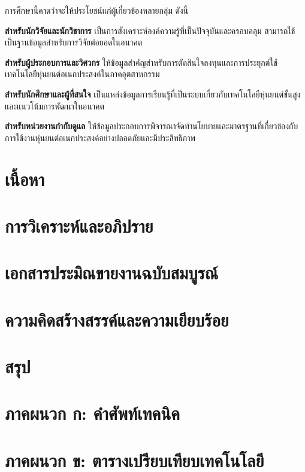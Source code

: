 \documentclass[a4paper]{article}
\begin{document}
การศึกษานี้คาดว่าจะให้ประโยชน์แก่ผู้เกี่ยวข้องหลายกลุ่ม ดังนี้

\textbf{สำหรับนักวิจัยและนักวิชาการ} เป็นการสังเคราะห์องค์ความรู้ที่เป็นปัจจุบันและครอบคลุม สามารถใช้เป็นฐานข้อมูลสำหรับการวิจัยต่อยอดในอนาคต

\textbf{สำหรับผู้ประกอบการและวิศวกร} ให้ข้อมูลสำคัญสำหรับการตัดสินใจลงทุนและการประยุกต์ใช้เทคโนโลยีหุ่นยนต์อเนกประสงค์ในภาคอุตสาหกรรม

\textbf{สำหรับนักศึกษาและผู้ที่สนใจ} เป็นแหล่งข้อมูลการเรียนรู้ที่เป็นระบบเกี่ยวกับเทคโนโลยีหุ่นยนต์ขั้นสูงและแนวโน้มการพัฒนาในอนาคต

\textbf{สำหรับหน่วยงานกำกับดูแล} ให้ข้อมูลประกอบการพิจารณาจัดทำนโยบายและมาตรฐานที่เกี่ยวข้องกับการใช้งานหุ่นยนต์อเนกประสงค์อย่างปลอดภัยและมีประสิทธิภาพ

\section{เนื้อหา}

\section{การวิเคราะห์และอภิปราย}

\section{เอกสารประมิณขายงานฉบับสมบูรณ์}

\section{ความคิดสร้างสรรค์และความเยียบร้อย}

\section{สรุป}

\printbibliography[title=เอกสารอ้างอิง]

\appendix

\section{ภาคผนวก ก: คำศัพท์เทคนิค}

\section{ภาคผนวก ข: ตารางเปรียบเทียบเทคโนโลยี}
\end{document}
